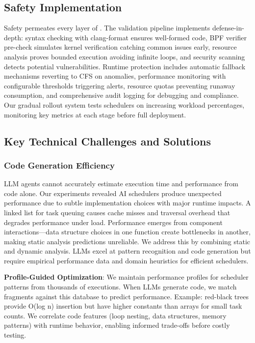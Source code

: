 \subsection{Safety Implementation}

Safety permeates every layer of \sys. The validation pipeline implements defense-in-depth: syntax checking with clang-format ensures well-formed code, BPF verifier pre-check simulates kernel verification catching common issues early, resource analysis proves bounded execution avoiding infinite loops, and security scanning detects potential vulnerabilities. Runtime protection includes automatic fallback mechanisms reverting to CFS on anomalies, performance monitoring with configurable thresholds triggering alerts, resource quotas preventing runaway consumption, and comprehensive audit logging for debugging and compliance. Our gradual rollout system tests schedulers on increasing workload percentages, monitoring key metrics at each stage before full deployment.

\subsection{Key Technical Challenges and Solutions}

\subsubsection{Code Generation Efficiency}

LLM agents cannot accurately estimate execution time and performance from code alone. Our experiments revealed AI schedulers produce unexpected performance due to subtle implementation choices with major runtime impacts. A linked list for task queuing causes cache misses and traversal overhead that degrades performance under load. Performance emerges from component interactions—data structure choices in one function create bottlenecks in another, making static analysis predictions unreliable. We address this by combining static and dynamic analysis. LLMs excel at pattern recognition and code generation but require empirical performance data and domain heuristics for efficient schedulers.

\textbf{Profile-Guided Optimization}: We maintain performance profiles for scheduler patterns from thousands of executions. When LLMs generate code, we match fragments against this database to predict performance. Example: red-black trees provide O(log n) insertion but have higher constants than arrays for small task counts. We correlate code features (loop nesting, data structures, memory patterns) with runtime behavior, enabling informed trade-offs before costly testing.

